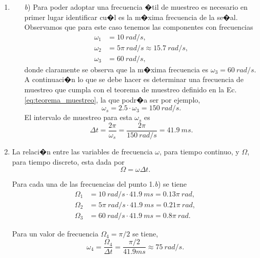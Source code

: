 \documentclass[10pt,a4paper]{article}
\begin{document}
\begin{enumerate}
\item 
\begin{enumerate}
\item[\textit{b})]
Para poder adoptar una frecuencia �til de muestreo es necesario en primer lugar identificar cu�l es la m�xima frecuencia de la se�al. Observamos que para este caso tenemos las componentes con frecuencias
\begin{align}
\omega_1 &= 10 ~rad/s, \\
\omega_2 &= 5\pi ~rad/s \approx 15.7 ~rad/s, \\
\omega_3 &= 60 ~rad/s,
\end{align}
donde claramente se observa que la m�xima frecuencia es $\omega_3 = 60 ~rad/s$. A continuaci�n lo que se debe hacer es determinar una frecuencia de muestreo que cumpla con el teorema de muestreo definido en la Ec. \ref{eq:teorema_muestreo}, la que podr�a ser por ejemplo,
\begin{equation}
\omega_s = 2.5 \cdot\omega_3 = 150 ~rad/s.
\end{equation}
El intervalo de muestreo para esta $\omega_s$ es
\begin{equation}
\Delta t=\frac{2\pi}{\omega_s}=\frac{2\pi}{150~rad/s}=41.9~ms.
\end{equation}
\end{enumerate}


\item
La relaci�n entre las variables de frecuencia $\omega$, para tiempo continuo, y $\Omega$, para tiempo discreto, esta dada por
\begin{equation}
\Omega = \omega \Delta t.
\end{equation}

Para cada una de las frecuencias del punto 1.\textit{b}) se tiene
\begin{align}
\Omega_1 &= 10 ~rad/s \cdot 41.9~ms = 0.13\pi ~rad, \\
\Omega_2 &= 5\pi ~rad/s \cdot 41.9~ms = 0.21\pi ~rad, \\
\Omega_3 &= 60 ~rad/s\cdot 41.9~ms = 0.8\pi ~rad.
\end{align}

Para un valor de frecuencia $\Omega_4=\pi/2$ se tiene,
\begin{equation}
\omega_4=\frac{\Omega_4}{\Delta t}=\frac{\pi/2}{41.9ms}\approx 75 ~rad/s.
\end{equation}


\end{enumerate}
\end{document}
